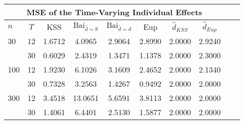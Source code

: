 \begin{tabular}{lccccccccc} 
\hline \multicolumn{8}{c}{MSE of the Time-Varying Individual Effects} \\ \hline 
$n$ & $T$ & KSS & $ \text{Bai}_{\hat{d} = 8}$ & $\text{Bai}_{\hat{d} = d}$ & Eup & $\hat{d}_{KSS}$ & $\hat{d}_{Eup}$ \\
\hline
30 & 12 &  1.6712  &  4.0965  &  2.9064  &  2.8990  &  2.0000  &  2.9240  \\
& 30 &  0.6029  &  2.4319  &  1.3471  &  1.1378  &  2.0000  &  2.3000  \\
100 & 12 &  1.9230  &  6.1026  &  3.1609  &  2.4652  &  2.0000  &  2.1340  \\
& 30 &  0.7328  &  3.2563  &  1.4267  &  0.9492  &  2.0000  &  2.0000  \\
300 & 12 &  3.4518  &  13.0651  &  5.6591  &  3.8113  &  2.0000  &  2.0000  \\
& 30 &  1.4061  &  6.4401  &  2.5130  &  1.5877  &  2.0000  &  2.0000  \\
\end{tabular} 

